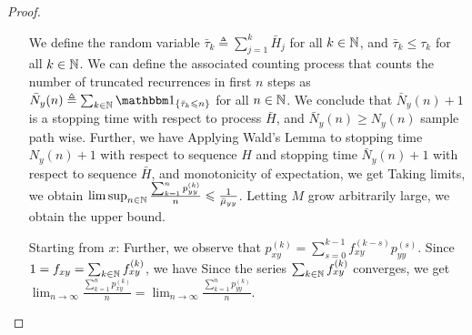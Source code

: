 \documentclass[letterpaper,10pt,english]{article}
\begin{document}
\begin{proof}
\begin{itemize}
We define the random variable $\bar{\tau}_k \triangleq \sum_{j=1}^k\bar{H}_j$ for all $k \in \N$, 
and $\bar{\tau}_k \le \tau_k$ for all $k \in \N$. 
We can define the associated counting process that counts the number of truncated recurrences in first $n$ steps as 
$\bar{N}_y(n) \triangleq \sum_{k\in \N}\SetIn{\bar{\tau}_k \le n}$ for all $n \in \N$. 
We conclude that $\bar{N}_y(n)+1$ is a stopping time with respect to \iid process $\bar{H}$, 
and $\bar{N}_y(n) \ge N_y(n)$ sample path wise. 
Further, we have 
Applying Wald's Lemma to stopping time $N_y(n)+1$ with respect to \iid sequence $H$ and stopping time $\bar{N}_y(n)+1$ with respect to \iid sequence $\bar{H}$, 
and monotonicity of expectation, we get 
Taking limits, we obtain $\lim\sup_{n \in \N}\frac{\sum_{k=1}^np_{yy}^{(k)}}{n} \le \frac{1}{\bar{\mu}_{yy}}$. 
Letting $M$ grow arbitrarily large, we obtain the upper bound. 

\item[Starting from $x$: ] Further, we observe that $p_{xy}^{(k)} = \sum_{s=0}^{k-1}f_{xy}^{(k-s)}p_{yy}^{(s)}$.  
Since $1 = f_{xy} = \sum_{k \in \mathbb{N}}f_{xy}^{(k)}$, we have 
Since the series $\sum_{k \in \mathbb{N}}f_{xy}^{(k)}$ converges, we get 
$\lim_{n \to \infty}\frac{\sum_{k=1}^np_{xy}^{(k)}}{n} = \lim_{n \to \infty}\frac{\sum_{k=1}^np_{yy}^{(k)}}{n}. $
\end{itemize}
\end{proof}
\end{document}
